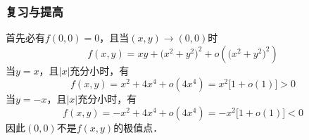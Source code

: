 \documentclass[14pt,notheorems,leqno,xcolor={rgb}]{beamer} %
\begin{document}
\begin{sframe}
\frametitle{复习与提高}
\begin{solution}
首先必有$f(0,0)=0$，且当$(x,y)\to(0,0)$时
\[ f(x,y)=xy+\big(x^2+y^2\big)^2+o\left(\big(x^2+y^2\big)^2\right) \]
当$y=x$，且$|x|$充分小时，有
\[ f(x,y)=x^2+4x^4+o(4x^4)=x^2\big[1+o(1)\big]>0 \]
当$y=-x$，且$|x|$充分小时，有
\[ f(x,y)=-x^2+4x^4+o(4x^4)=-x^2\big[1+o(1)\big]<0 \]
因此$(0,0)$不是$f(x,y)$的极值点．
\end{solution}
\end{sframe}
\end{document}
